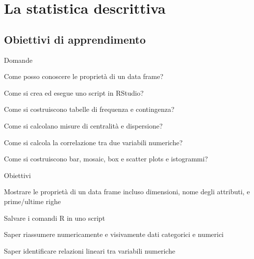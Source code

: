 \chapter{La statistica descrittiva}
\label{cap:descrittiva}


\section*{Obiettivi di apprendimento}


\begin{multicols}{2}
\begin{tcolorbox}[width=1\linewidth, halign=left, colframe=blue!60, colback=white, boxsep=1mm, arc=3mm]

Domande

\begin{myitemize}
	\item Come posso conoscere le propriet\`a di un data frame?
	\item Come si crea ed esegue uno script in RStudio?
	\item Come si costruiscono tabelle di frequenza e contingenza?
	\item Come si calcolano misure di centralit\`a e dispersione?
	\item Come si calcola la correlazione tra due variabili numeriche?
	\item Come si costruiscono bar, mosaic, box e scatter plots e istogrammi?
\end{myitemize}

\end{tcolorbox} 
\columnbreak
\begin{tcolorbox}[width=1\linewidth, halign=left, colframe=blue!60, colback=white, boxsep=1mm, arc=3mm]

Obiettivi

\begin{myitemize}
	\item Mostrare le propriet\`a di un data frame incluso dimensioni, nome degli attributi, e prime/ultime righe 
	\item Salvare i comandi R in uno script
	\item Saper riassumere numericamente e visivamente dati categorici e numerici
	\item Saper identificare relazioni lineari tra variabili numeriche
\end{myitemize}

\end{tcolorbox} 
\columnbreak
\end{multicols}



